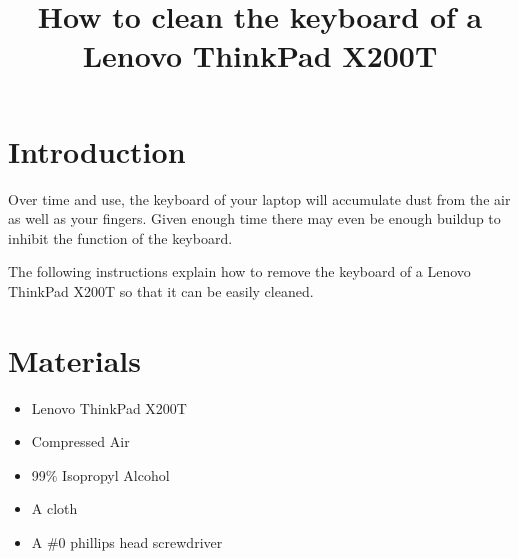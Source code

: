 \documentclass{article}
\title{How to clean the keyboard of a Lenovo ThinkPad X200T}
\begin{document}
\maketitle

\section*{Introduction}
Over time and use, the keyboard of your laptop will accumulate dust from the air as well as your fingers.
Given enough time there may even be enough buildup to inhibit the function of the keyboard.

\vspace{12pt} %

\noindent The following instructions explain how to remove the keyboard of a Lenovo ThinkPad X200T so that it can be easily cleaned.

\section*{Materials}
\begin{itemize}
	\item Lenovo ThinkPad X200T
	\item Compressed Air
	\item 99\% Isopropyl Alcohol
	\item A cloth
	\item A \#0 phillips head screwdriver
\end{itemize}

\clearpage
\end{document}

